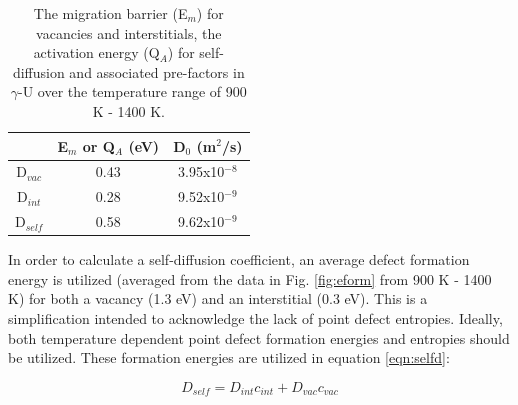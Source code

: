 \documentclass[review]{elsarticle}
\begin{document}
\FloatBarrier

\begin{table}[h]
\caption{The migration barrier (E$_m$) for vacancies and interstitials, the activation energy (Q$_A$) for self-diffusion and associated pre-factors in $\gamma$-U over the temperature range of 900 K - 1400 K.}  \label{tab:diff}
\begin{center}
\begin{tabular}{|c|c|c|}
	\hline
	 & E$_m$ or Q$_A$ (eV) & D$_0$ (m$^2$/s) \\
	 \hline
	 D$_{vac}$ & 0.43 & 3.95x10$^{-8}$ \\
	 D$_{int}$ & 0.28 & 9.52x10$^{-9}$ \\
	 D$_{self}$ & 0.58 & 9.62x10$^{-9}$ \\
	 \hline
\end{tabular}
\end{center}
\label{default}
\end{table}

In order to calculate a self-diffusion coefficient, an average defect formation energy is utilized (averaged from the data in Fig. \ref{fig:eform} from 900 K - 1400 K) for both a vacancy (1.3 eV) and an interstitial (0.3 eV). This is a simplification intended to acknowledge the lack of point defect entropies. Ideally, both temperature dependent point defect formation energies and entropies should be utilized. These formation energies are utilized in equation \ref{eqn:selfd}:

\begin{equation}
\label{eqn:selfd}
D_{self} = D_{int}c_{int} + D_{vac}c_{vac}
\end{equation} 
\end{document}

